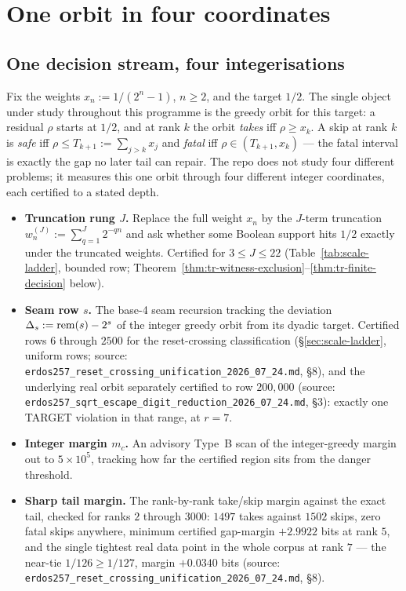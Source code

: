 \documentclass[11pt]{article}
\theoremstyle{plain}
\theoremstyle{definition}
\theoremstyle{remark}
\let\origmathrm\mathrm
\renewcommand{\mathrm}[1]{\ifmmode\origmathrm{#1}\else\textrm{#1}\fi}%
\begin{document}
\section{One orbit in four coordinates}
\label{sec:four-coordinates}

\subsection*{One decision stream, four integerisations}

Fix the weights $x_n:=1/(2^n-1)$, $n\ge2$, and the target $1/2$. The single object under study
throughout this programme is the greedy orbit for this target: a residual $\rho$ starts at $1/2$,
and at rank $k$ the orbit \emph{takes} iff $\rho\ge x_k$. A skip at rank $k$ is \emph{safe} iff
$\rho\le T_{k+1}:=\sum_{j>k}x_j$ and \emph{fatal} iff $\rho\in(T_{k+1},x_k)$ — the fatal interval is
exactly the gap no later tail can repair. The repo does not study four different problems; it
measures this one orbit through four different integer coordinates, each certified to a stated
depth.

\begin{itemize}
\item \textbf{Truncation rung $J$.} Replace the full weight $x_n$ by the $J$-term truncation
$w_n^{(J)}:=\sum_{q=1}^{J}2^{-qn}$ and ask whether some Boolean support hits $1/2$ exactly under
the truncated weights. Certified for $3\le J\le22$ (Table~\ref{tab:scale-ladder}, bounded row;
Theorem~\ref{thm:tr-witness-exclusion}--\ref{thm:tr-finite-decision} below).
\item \textbf{Seam row $s$.} The base-4 seam recursion tracking the deviation $\Delta_s:=\mathrm{rem}(s)-2^s$
of the integer greedy orbit from its dyadic target. Certified rows $6$ through $2500$ for the
reset-crossing classification (\S\ref{sec:scale-ladder}, uniform rows; source:
\texttt{erdos257\_reset\_crossing\_unification\_2026\_07\_24.md}, \S8), and the underlying real
orbit separately certified to row $200{,}000$ (source: \texttt{erdos257\_sqrt\_escape\_digit\_reduction\_2026\_07\_24.md},
\S3): exactly one TARGET violation in that range, at $r=7$.
\item \textbf{Integer margin $m_c$.} An advisory Type~B scan of the integer-greedy margin out to
$5\times10^5$, tracking how far the certified region sits from the danger threshold.
\item \textbf{Sharp tail margin.} The rank-by-rank take/skip margin against the exact tail, checked
for ranks $2$ through $3000$: $1497$ takes against $1502$ skips, zero fatal skips anywhere, minimum
certified gap-margin $+2.9922$ bits at rank $5$, and the single tightest real data point in the
whole corpus at rank $7$ — the near-tie $1/126\ge1/127$, margin $+0.0340$ bits (source:
\texttt{erdos257\_reset\_crossing\_unification\_2026\_07\_24.md}, \S8).
\end{itemize}
\end{document}

